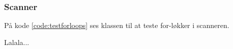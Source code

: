 \subsubsection*{Scanner}

På kode \ref{code:testforloops} ses klassen til at teste for-løkker i scanneren. 


\noindent Lalala...